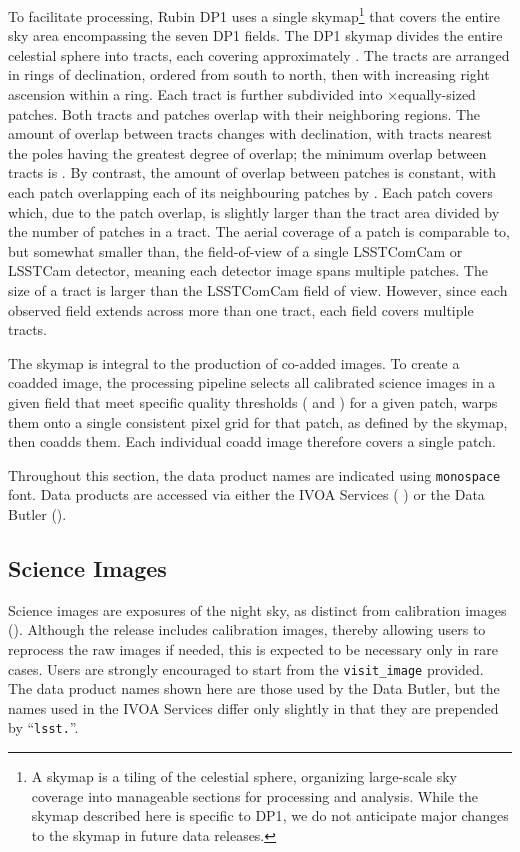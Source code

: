 To facilitate processing, Rubin \gls{DP1} uses a single skymap\footnote{A skymap is a tiling of the celestial sphere, organizing large-scale sky coverage into manageable sections for processing and analysis. While the skymap described here is specific to \gls{DP1}, we do not anticipate major changes to the skymap in future data releases.} that covers the entire sky area encompassing the seven \gls{DP1} fields.
The \gls{DP1} skymap divides the entire celestial sphere into \ntotaltracts \gls{tract}s, each covering approximately \tractarea.
The \gls{tract}s are arranged in rings of declination, ordered from south to north, then with increasing right ascension within a ring.
Each \gls{tract} is further subdivided into \npatchx$\times$\npatchy equally-sized patches.
Both \gls{tract}s and patches overlap with their neighboring regions.
The amount of overlap between \gls{tract}s changes with declination, with \gls{tract}s nearest the poles having the greatest degree of overlap; the minimum overlap between tracts is \tractoverlap.
By contrast, the amount of overlap between patches is constant, with each \gls{patch} overlapping each of its neighbouring patches by \patchoverlap.
Each patch covers \outerpatcharea which, due to the patch overlap, is slightly larger than the tract area divided by the number of patches in a tract.
The aerial coverage of a patch is comparable to, but somewhat smaller than, the \rawfov field-of-view of a single \gls{LSSTComCam} or \gls{LSSTCam} detector, meaning each detector image spans multiple patches.
The size of a tract is larger than the \gls{LSSTComCam} field of view. However, since each observed field extends across more than one tract, each field covers multiple tracts.

The skymap is integral to the production of co-added images.
To create a coadded image, the processing pipeline selects all calibrated science images in a given field that meet specific quality thresholds ( and ) for a given \gls{patch}, warps them onto a single consistent pixel grid for that \gls{patch}, as defined by the skymap, then coadds them.
Each individual coadd image therefore covers a single \gls{patch}.

Throughout this section, the data product names are indicated using \texttt{monospace} font.
Data products are accessed via either the \gls{IVOA} Services ( ) or the Data \gls{Butler} ().

\subsection{Science Images}
\label{ssec:science_images}
Science images are exposures of the night sky, as distinct from \gls{calibration} images ().
Although the release includes \gls{calibration} images, thereby allowing users to reprocess the raw images if needed, this is expected to be necessary only in rare cases.
Users are strongly encouraged to start from the \texttt{visit\_image} provided.
The data product names shown here are those used by the Data \gls{Butler}, but the names used in the \gls{IVOA} Services differ only slightly in that they are prepended by ``\texttt{lsst.}''.

